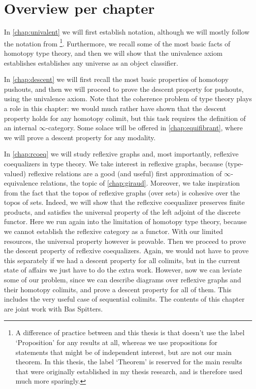 \section{Overview per chapter}
In \cref{chap:univalent} we will first establish notation, although we will mostly follow the notation from \cite{hottbook}\footnote{A difference of practice between \cite{hottbook} and this thesis is that \cite{hottbook} doesn't use the label `Proposition' for any results at all, whereas we use propositions for statements that might be of independent interest, but are not our main theorem. In this thesis, the label `Theorem' is reserved for the main results that were originally established in my thesis research, and is therefore used much more sparingly.}. Furthermore, we recall some of the most basic facts of homotopy type theory, and then we will show that the univalence axiom establishes establishes any universe as an object classifier. 

In \cref{chap:descent} we will first recall the most basic properties of homotopy pushouts, and then we will proceed to prove the descent property for pushouts, using the univalence axiom. Note that the coherence problem of type theory plays a role in this chapter: we would much rather have shown that the descent property holds for any homotopy colimit, but this task requires the definition of an internal $\infty$-category. Some solace will be offered in \cref{chap:equifibrant}, where we will prove a descent property for any modality.

In \cref{chap:rcoeq} we will study reflexive graphs and, most importantly, reflexive coequalizers in type theory. We take interest in reflexive graphs, because (type-valued) reflexive relations are a good (and useful) first approximation of $\infty$-equivalence relations, the topic of \cref{chap:giraud}. Moreover, we take inspiration from the fact that the topos of reflexive graphs (over sets) is cohesive over the topos of sets. Indeed, we will show that the reflexive coequalizer preserves finite products, and satisfies the universal property of the left adjoint of the discrete functor. Here we run again into the limitation of homotopy type theory, because we cannot establish the reflexive category as a functor. With our limited resources, the universal property however is provable. Then we proceed to prove the descent property of reflexive coequalizers. Again, we would not have to prove this separately if we had a descent property for all colimits, but in the current state of affairs we just have to do the extra work. However, now we can leviate some of our problem, since we can describe diagrams over reflexive graphs and their homotopy colimits, and prove a descent property for all of them. This includes the very useful case of sequential colimits. The contents of this chapter are joint work with Bas Spitters.

